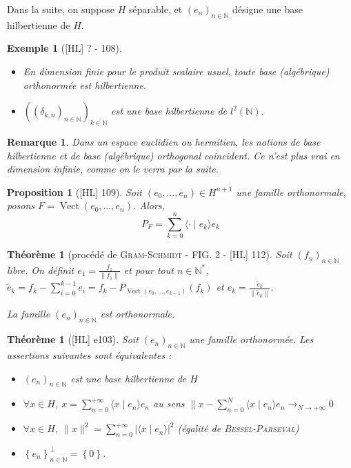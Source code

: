 \documentclass[10pt, a4paper, parskip=full, twoside, twocolumn]{report}
\newtheorem{theorem}[definition]{Théorème}
\newtheorem{proposition}[definition]{Proposition}
\newtheorem{example}[definition]{Exemple}
\newtheorem{remark}[definition]{Remarque}
\newcommand{\IN}{\mathbb{N}}
\newcommand{\ps}[2]{\langle #1\mid #2\rangle}
\DeclareMathOperator{\Vect}{Vect}
\begin{document}
\textcolor{paragraphtext}{Dans la suite, on suppose $H$ séparable, et $(e_n)_{n\in\IN}$ désigne une base hilbertienne de $H$.}

\begin{example}[\textnormal{[HL] ? - 108}]
	\begin{itemize}
		\item En dimension finie pour le produit scalaire usuel, toute base (algébrique) orthonormée est hilbertienne.
		\item $\left((\delta_{k,n})_{n\in\IN}\right)_{k\in\IN}$ est une base hilbertienne de $l^2(\IN)$.
	\end{itemize}
\end{example}

\begin{remark}
	Dans un espace euclidien ou hermitien, les notions de base hilbertienne et de base (algébrique) orthogonal coincident. Ce n'est plus vrai en dimension infinie, comme on le verra par la suite.
\end{remark}

\begin{proposition}[\textnormal{[HL] 109}]
	Soit $(e_0,\dots,e_n)\in H^{n+1}$ une famille orthonormale, posons $F = \Vect(e_0,\dots, e_n)$.
	Alors,
	$$P_F = \sum_{k=0}^{n} \ps{\cdot}{e_k}e_k$$
\end{proposition}

\begin{theorem}[procédé de \textsc{Gram-Schmidt} - FIG. 2 - \textnormal{[HL] 112}]
	Soit $\left(f_n\right)_{n\in\IN}$ libre. On définit $e_1 = \frac{f_1}{\|f_1\|}$ et pour tout $n\in \IN^*$, $\tilde{e}_k = f_k - \sum_{i=0}^{k-1}e_i = f_k - P_{\Vect(e_0,\dots, e_{k-1})}(f_k)$
	et $e_k = \frac{\tilde{e}_k}{\|\tilde{e}_k\|}$.

	La famille $\left(e_n\right)_{n\in \IN}$ est orthonormale.
\end{theorem}

\begin{theorem}[\textnormal{[HL] e103}]
	Soit $\left(e_n\right)_{n\in\IN}$ une famille orthonormée.
	Les assertions suivantes sont équivalentes :
	\begin{itemize}
		\item $\left(e_n\right)_{n\in\IN}$ est une base hilbertienne de $H$
		\item $\forall x\in H$, $x = \sum_{n=0}^{+\infty} \ps{x}{e_n}e_n$ au sens $\|x - \sum_{n=0}^{N}\ps{x}{e_n}e_n \longrightarrow_{N\to +\infty} 0$
		\item $\forall x\in H$, $\|x\|^2 = \sum_{n=0}^{+\infty}\vert \ps{x}{e_n}\vert^2$ (égalité de \textsc{Bessel-Parseval})
		\item $\left\{e_n\right\}_{n\in\IN}^{\perp} = \left\{0\right\}$.
	\end{itemize}
\end{theorem}
\end{document}
